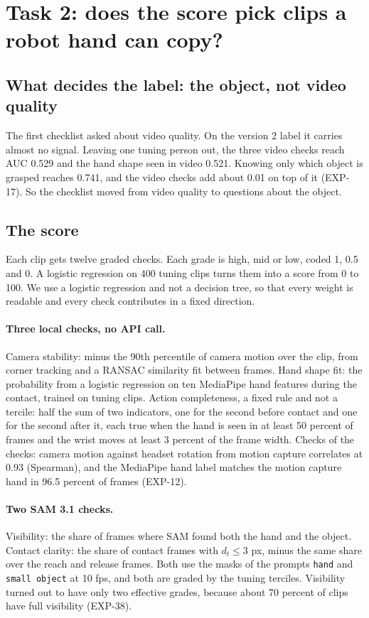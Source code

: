 \documentclass[10pt,twocolumn,letterpaper]{article}
\begin{document}
\section{Task 2: does the score pick clips a robot hand can copy?}
\label{sec:num2}

\subsection{What decides the label: the object, not video quality}

The first checklist asked about video quality. On the version 2 label it
carries almost no signal. Leaving one tuning person out, the three video
checks reach AUC 0.529 and the hand shape seen in video 0.521. Knowing only
which object is grasped reaches 0.741, and the video checks add about 0.01 on
top of it (EXP-17). So the checklist moved from video quality to questions
about the object.

\subsection{The score}

Each clip gets twelve graded checks. Each grade is high, mid or low, coded 1,
0.5 and 0. A logistic regression on 400 tuning clips turns them into a score
from 0 to 100. We use a logistic regression and not a decision tree, so that
every weight is readable and every check contributes in a fixed direction.

\paragraph{Three local checks, no API call.} Camera stability: minus the 90th
percentile of camera motion over the clip, from corner tracking and a RANSAC
similarity fit between frames. Hand shape fit: the probability from a logistic
regression on ten MediaPipe hand features during the contact, trained on
tuning clips. Action completeness, a fixed rule and not a tercile: half the sum
of two indicators, one for the second before contact and one for the second
after it, each true when the hand is seen in at least 50 percent of frames and
the wrist moves at least 3 percent of the frame width. Checks of the checks:
camera motion against headset rotation from motion capture correlates at 0.93
(Spearman), and the MediaPipe hand label matches the motion capture hand in
96.5 percent of frames (EXP-12).

\paragraph{Two SAM 3.1 checks.} Visibility: the share of frames where SAM
found both the hand and the object. Contact clarity: the share of contact
frames with $d_t \le 3$ px, minus the same share over the reach and release
frames. Both use the masks of the prompts \texttt{hand} and
\texttt{small object} at 10 fps, and both are graded by the tuning terciles.
Visibility turned out to have only two effective grades, because about 70
percent of clips have full visibility (EXP-38).
\end{document}
